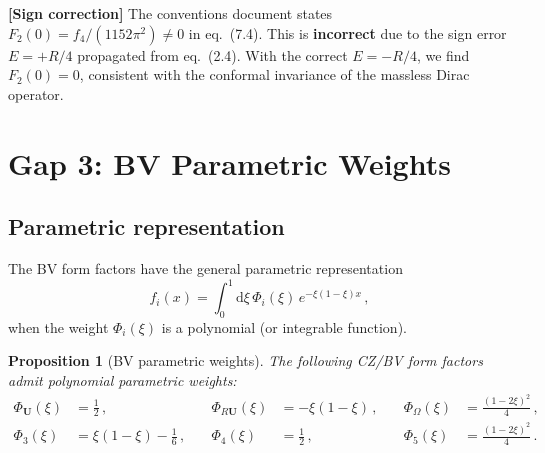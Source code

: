 \documentclass[11pt,a4paper]{article}
\renewcommand{\dd}{\mathrm{d}}
\newtheorem{proposition}[theorem]{Proposition}
\theoremstyle{definition}
\theoremstyle{remark}
\newcommand{\signcorrection}[1]{%
  \par\noindent\colorbox{red!10}{%
    \parbox{\dimexpr\linewidth-2\fboxsep}{%
      \textcolor{red!50!black}{\textbf{[Sign correction]}}
      \textcolor{red!50!black}{#1}%
    }%
  }\par%
}
\begin{document}
\signcorrection{The conventions document states $F_2(0) = f_4/(1152\pi^2) \neq 0$
  in eq.~(7.4).  This is \textbf{incorrect} due to the sign error $E = +R/4$
  propagated from eq.~(2.4).  With the correct $E = -R/4$, we find $F_2(0) = 0$,
  consistent with the conformal invariance of the massless Dirac operator.}


\newpage
\section{Gap 3: BV Parametric Weights}
\label{sec:gap3}

\subsection{Parametric representation}

The BV form factors have the general parametric representation
\begin{equation}
  f_i(x) = \int_0^1 \dd\xi\,\Phi_i(\xi)\,e^{-\xi(1-\xi)x}\,,
  \label{eq:BV-param}
\end{equation}
when the weight $\Phi_i(\xi)$ is a polynomial (or integrable function).

\begin{proposition}[BV parametric weights]
\label{prop:BV-weights}
The following CZ/BV form factors admit polynomial parametric weights:
\begin{equation}
  \boxed{
  \begin{aligned}
  \Phi_{\mathbf{U}}(\xi) &= \frac{1}{2}\,,
  &\quad \Phi_{R\mathbf{U}}(\xi) &= -\xi(1-\xi)\,,
  &\quad \Phi_\Omega(\xi) &= \frac{(1-2\xi)^2}{4}\,,\\[4pt]
  \Phi_3(\xi) &= \xi(1-\xi) - \frac{1}{6}\,,
  &\quad \Phi_4(\xi) &= \frac{1}{2}\,,
  &\quad \Phi_5(\xi) &= \frac{(1-2\xi)^2}{4}\,.
  \end{aligned}
  }
  \label{eq:poly-weights}
\end{equation}
\end{proposition}
\end{document}
